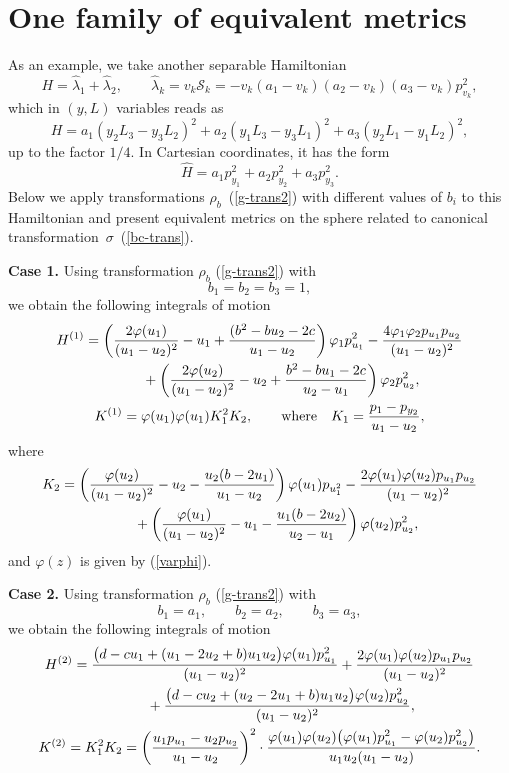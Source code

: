 \documentclass[pdftex]{sigma}
\numberwithin{equation}{section}
\begin{document}
\section{One family of equivalent metrics}

As an example, we take another separable Hamiltonian
\[
H=\hat{\lambda}_1+\hat{\lambda}_2 ,\qquad \hat{\lambda}_k=v_k\mathcal{S}_k=-v_k(a_1-v_k)(a_2-v_k)(a_3-v_k)p_{v_k}^2 ,
\]
which in $(y,L)$ variables reads as
\[H=a_1(y_2L_3-y_3L_2)^2 + a_2(y_1L_3-y_3L_1)^2 + a_3(y_2L_1 -y_1L_2)^2 ,\]
up to the factor $1/4$. In Cartesian coordinates, it has the form
\[
\hat{H}=a_1p_{y_1}^2+a_2p_{y_2}^2+a_3p_{y_3}^2 .
\]
Below we apply transformations $\rho_b$~(\ref{g-trans2}) with different values of $b_i$ to this Hamiltonian and present equivalent metrics on the sphere related to canonical transformation~$\sigma$~(\ref{bc-trans}).

\textbf{Case 1.} Using transformation $\rho_b$ (\ref{g-trans2}) with
\[b_1=b_2=b_3=1,\]
we obtain the following integrals of motion
\begin{gather}
H^{(1)}= \left(\dfrac{2\varphi(u_1)}{(u_1-u_2)^2} - u_1 +\dfrac{(b^2 - bu_2 - 2c}{u_1-u_2}\right)\varphi_1p_{u_1}^2-\dfrac{4\varphi_1\varphi_2 p_{u_1}p_{u_2}}{(u_1-u_2 )^2}
\nonumber \\
\hphantom{H^{(1)}=}{}  + \left(\dfrac{2\varphi(u_2)}{(u_1 -u_2)^2} - u_2 +\dfrac{b^2 - bu_1 - 2c}{u_2-u_1}\right)\varphi_2p_{u_2}^2,\label{case1} \\
K^{(1)}= \varphi(u_1)\varphi(u_1) K_1^2 K_2 ,\qquad\text{where}\quad K_1=\dfrac{p_1-p_{y_2}}{u_1-u_2} ,\nonumber
\end{gather}
where
\begin{gather*}
K_2= \left(\dfrac{\varphi(u_2)}{(u_1-u_2)^2} - u_2 - \frac{u_2(b - 2u_1)}{u_1-u_2}\right)\varphi(u_1)p_{u_1^2}
 -\dfrac{ 2\varphi(u_1)\varphi(u_2)p_{u_1}p_{u_2}}{(u_1-u_2)^2} \\
 \hphantom{K_2=}{}
 +  \left(\dfrac{\varphi(u_1)}{(u_1-u_2)^2} - u_1 -\frac{u_1(b - 2u_2)}{u_2-u_1}\right)\varphi(u_2)p_{u_2}^2 ,
\end{gather*}
and $\varphi(z)$ is given by (\ref{varphi}).

\textbf{Case 2.} Using transformation $\rho_b$ (\ref{g-trans2}) with
\[b_1=a_1,\qquad b_2=a_2,\qquad b_3=a_3,\]
 we obtain the following integrals of motion
 \begin{gather}
 H^{(2)}=
 \dfrac{\bigl(d - cu_1 + (u_1 - 2u_2 + b)u_1u_2\bigr)\varphi(u_1)p_{u_1}^2}{(u_1-u_2)^2}
 + \dfrac{ 2\varphi(u_1)\varphi(u_2)p_{u_1}p_{u_2}}{(u_1-u_2)^2}\nonumber\\
\hphantom{H^{(2)}=}{}
 + \dfrac{\bigl(d - cu_2 + (u_2 - 2u_1 + b)u_1u_2\bigr)\varphi(u_2)p_{u_2}^2}{(u_1-u_2)^2} ,\nonumber\\
 K^{(2)}=K_1^2K_2=\left( \dfrac{u_1p_{u_1}-u_2p_{u_2}}{u_1-u_2}\right)^2\cdot \dfrac{\varphi(u_1)\varphi(u_2)\bigl(\varphi(u_1)p_{u_1}^2 - \varphi(u_2)p_{u_2}^2\bigr)}{u_1u_2(u_1 - u_2)} . \label{case2}
\end{gather}
\end{document}
